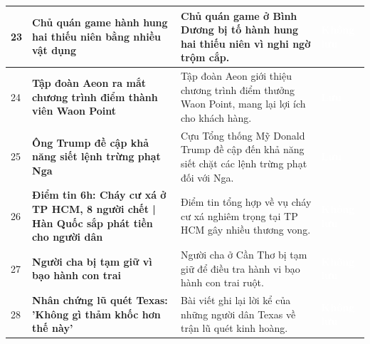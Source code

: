 \documentclass[12pt,a4paper]{article}
\begin{document}
\begin{longtable}{|p{}|L{0.45\textwidth}|L{0.42\textwidth}|p{0.06\textwidth}|}
23 & \textbf{Chủ quán game hành hung hai thiếu niên bằng nhiều vật dụng}  & Chủ quán game ở Bình Dương bị tố hành hung hai thiếu niên vì nghi ngờ trộm cắp. & \textcolor{white}{\textbf{Không lưu}} \\
\hline

24 & \textbf{Tập đoàn Aeon ra mắt chương trình điểm thành viên Waon Point}  & Tập đoàn Aeon giới thiệu chương trình điểm thưởng Waon Point, mang lại lợi ích cho khách hàng. & \textcolor{white}{\textbf{Lưu}} \\
\hline

25 & \textbf{Ông Trump đề cập khả năng siết lệnh trừng phạt Nga}  & Cựu Tổng thống Mỹ Donald Trump đề cập đến khả năng siết chặt các lệnh trừng phạt đối với Nga. & \textcolor{white}{\textbf{Lưu}} \\
\hline

26 & \textbf{Điểm tin 6h: Cháy cư xá ở TP HCM, 8 người chết | Hàn Quốc sắp phát tiền cho người dân}  & Điểm tin tổng hợp về vụ cháy cư xá nghiêm trọng tại TP HCM gây nhiều thương vong. & \textcolor{white}{\textbf{Không lưu}} \\
\hline

27 & \textbf{Người cha bị tạm giữ vì bạo hành con trai}  & Người cha ở Cần Thơ bị tạm giữ để điều tra hành vi bạo hành con trai ruột. & \textcolor{white}{\textbf{Không lưu}} \\
\hline

28 & \textbf{Nhân chứng lũ quét Texas: 'Không gì thảm khốc hơn thế này'}  & Bài viết ghi lại lời kể của những người dân Texas về trận lũ quét kinh hoàng. & \textcolor{white}{\textbf{Không lưu}} \\
\hline


\end{longtable}
\end{document}
